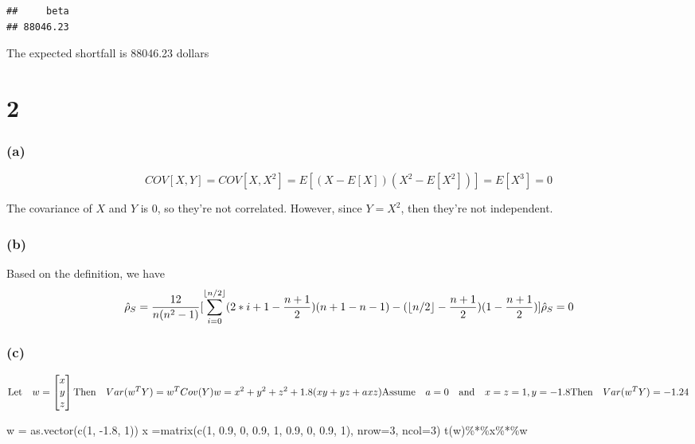 \documentclass[
]{article}
\newenvironment{Shaded}{\begin{snugshade}}{\end{snugshade}}
\newcommand{\AttributeTok}[1]{\textcolor[rgb]{0.77,0.63,0.00}{#1}}
\newcommand{\DecValTok}[1]{\textcolor[rgb]{0.00,0.00,0.81}{#1}}
\newcommand{\FloatTok}[1]{\textcolor[rgb]{0.00,0.00,0.81}{#1}}
\newcommand{\FunctionTok}[1]{\textcolor[rgb]{0.00,0.00,0.00}{#1}}
\newcommand{\NormalTok}[1]{#1}
\newcommand{\OtherTok}[1]{\textcolor[rgb]{0.56,0.35,0.01}{#1}}
\newcommand{\SpecialCharTok}[1]{\textcolor[rgb]{0.00,0.00,0.00}{#1}}
\begin{document}
\begin{verbatim}
##     beta 
## 88046.23
\end{verbatim}

The expected shortfall is 88046.23 dollars

\hypertarget{section}{%
\section{2}\label{section}}

\hypertarget{a-1}{%
\subsubsection{(a)}\label{a-1}}

\[
COV[X,Y] = COV[X, X^2] = E[(X-E[X])(X^2 - E[X^2])]=E[X^3]=0
\]

The covariance of \(X\) and \(Y\) is 0, so they're not correlated.
However, since \(Y=X^2\), then they're not independent.

\hypertarget{b-1}{%
\subsubsection{(b)}\label{b-1}}

Based on the definition, we have \[
\hat\rho_S=\frac{12}{n(n^2-1)}[\sum_{i=0}^{\lfloor n/2\rfloor}(2*i + 1-\frac{n+1}{2})(n+1-n-1)-(\lfloor n/2\rfloor-\frac{n+1}{2})(1-\frac{n+1}{2})]
\\\hat\rho_S=0
\]

\hypertarget{c-1}{%
\subsubsection{(c)}\label{c-1}}

\[\text{Let}\quad w=\begin{bmatrix}x\\y\\z\end{bmatrix}
\\\text{Then}\quad Var(w^TY)=w^TCov(Y)w=x^2+y^2+z^2+1.8(xy+yz+axz)
\\\text{Assume}\quad a=0\quad\text{and}\quad x=z=1,y=-1.8
\\\text{Then}\quad Var(w^TY)=-1.24
\]

\begin{Shaded}
\begin{Highlighting}[]
\NormalTok{w }\OtherTok{=} \FunctionTok{as.vector}\NormalTok{(}\FunctionTok{c}\NormalTok{(}\DecValTok{1}\NormalTok{, }\SpecialCharTok{{-}}\FloatTok{1.8}\NormalTok{, }\DecValTok{1}\NormalTok{))}
\NormalTok{x }\OtherTok{=}\FunctionTok{matrix}\NormalTok{(}\FunctionTok{c}\NormalTok{(}\DecValTok{1}\NormalTok{, }\FloatTok{0.9}\NormalTok{, }\DecValTok{0}\NormalTok{, }\FloatTok{0.9}\NormalTok{, }\DecValTok{1}\NormalTok{, }\FloatTok{0.9}\NormalTok{, }\DecValTok{0}\NormalTok{, }\FloatTok{0.9}\NormalTok{, }\DecValTok{1}\NormalTok{), }\AttributeTok{nrow=}\DecValTok{3}\NormalTok{, }\AttributeTok{ncol=}\DecValTok{3}\NormalTok{)}
\FunctionTok{t}\NormalTok{(w)}\SpecialCharTok{\%*\%}\NormalTok{x}\SpecialCharTok{\%*\%}\NormalTok{w}
\end{Highlighting}
\end{Shaded}
\end{document}
